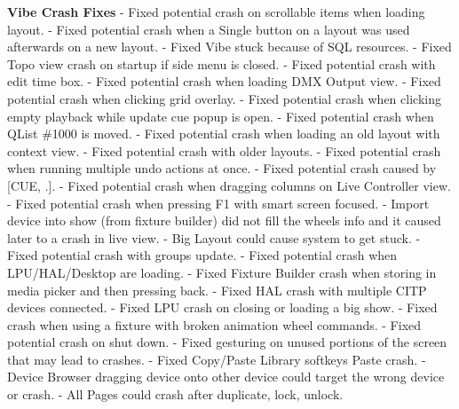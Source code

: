 \documentclass[
]{article}
\begin{document}
\textbf{Vibe Crash Fixes}
- Fixed potential crash on scrollable items when loading layout.
- Fixed potential crash when a Single button on a layout was used afterwards on a new layout.
- Fixed Vibe stuck because of SQL resources.
- Fixed Topo view crash on startup if side menu is closed.
- Fixed potential crash with edit time box.
- Fixed potential crash when loading DMX Output view.
- Fixed potential crash when clicking grid overlay.
- Fixed potential crash when clicking empty playback while update cue popup is open.
- Fixed potential crash when QList \#1000 is moved.
- Fixed potential crash when loading an old layout with context view.
- Fixed potential crash with older layouts.
- Fixed potential crash when running multiple undo actions at once.
- Fixed potential crash caused by {[}CUE, .{]}.
- Fixed potential crash when dragging columns on Live Controller view.
- Fixed potential crash when pressing F1 with smart screen focused.
- Import device into show (from fixture builder) did not fill the wheels info and it caused later to a crash in live view.
- Big Layout could cause system to get stuck.
- Fixed potential crash with groups update.
- Fixed potential crash when LPU/HAL/Desktop are loading.
- Fixed Fixture Builder crash when storing in media picker and then pressing back.
- Fixed HAL crash with multiple CITP devices connected.
- Fixed LPU crash on closing or loading a big show.
- Fixed crash when using a fixture with broken animation wheel commands.
- Fixed potential crash on shut down.
- Fixed gesturing on unused portions of the screen that may lead to crashes.
- Fixed Copy/Paste Library softkeys Paste crash.
- Device Browser dragging device onto other device could target the wrong device or crash.
- All Pages could crash after duplicate, lock, unlock.
\end{document}
